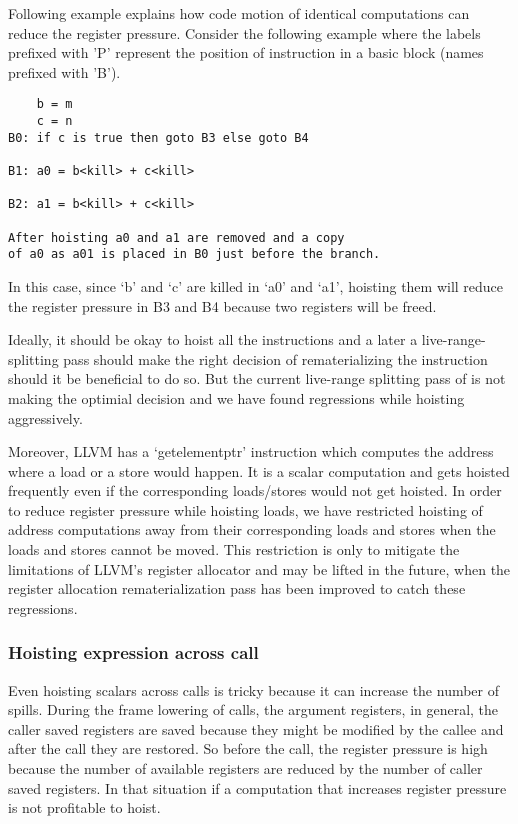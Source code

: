 \documentclass[acmlarge,review]{acmart}\settopmatter{printfolios=true}
\begin{document}
Following example explains how code motion of identical computations can reduce
the register pressure.  Consider the following example where the labels prefixed
with 'P' represent the position of instruction in a basic block (names prefixed
with 'B').

\begin{verbatim}
    b = m
    c = n
B0: if c is true then goto B3 else goto B4

B1: a0 = b<kill> + c<kill>

B2: a1 = b<kill> + c<kill>

After hoisting a0 and a1 are removed and a copy
of a0 as a01 is placed in B0 just before the branch.
\end{verbatim}

In this case, since `b' and `c' are killed in `a0' and `a1', hoisting them will
reduce the register pressure in B3 and B4 because two registers will be freed.

Ideally, it should be okay to hoist all the instructions and a later a
live-range-splitting \cite{cooper1998live} pass should make the right decision
of rematerializing the instruction should it be beneficial to do so. But the
current live-range splitting pass of \LLVM{} is not making the optimial decision
and we have found regressions while hoisting aggressively.

Moreover, LLVM has a `getelementptr' instruction which computes the address
where a load or a store would happen. It is a scalar computation and gets
hoisted frequently even if the corresponding loads/stores would not get hoisted.
In order to reduce register pressure while hoisting loads, we have restricted
hoisting of address computations away from their corresponding loads and stores
when the loads and stores cannot be moved.  This restriction is only to mitigate
the limitations of LLVM's register allocator and may be lifted in the future,
when the register allocation rematerialization pass has been improved to catch
these regressions.

\subsubsection{Hoisting expression across call}
\label{cost:across-calls}
Even hoisting scalars across calls is tricky because it can increase the number
of spills. During the frame lowering of calls, the argument registers, in
general, the caller saved registers are saved because they might be modified by
the callee and after the call they are restored. So before the call, the
register pressure is high because the number of available registers are reduced
by the number of caller saved registers. In that situation if a computation
that increases register pressure is not profitable to hoist.
\end{document}
